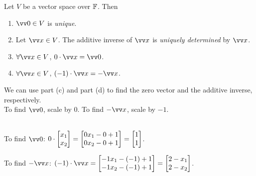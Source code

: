 \begin{proposition}
    Let $V$ be a vector space over ${\mathbb{F}}$. Then
    \begin{enumerate}[label=(\alph*)]
        \item $\vzero \in V$ is \textit{unique}.
        \item Let $\vx \in V$. The additive inverse of $\vx$ is \textit{uniquely determined}
        by $\vx$.
        \item $\forall \vx \in V$, $0 \cdot \vx = \vzero$.
        \item $\forall \vx \in V$, $(-1) \cdot \vx = -\vx$.
    \end{enumerate}
\end{proposition}

\begin{remark}
    We can use part (c) and part (d) to find the zero vector and the additive inverse, respectively.    \\
    To find $\vzero$, scale by 0. To find $-\vx$, scale by $-1$.

    \begin{example}
        \phantom{}  \vspace{1mm} \\
        To find $\vzero$: \quad
        $0 \cdot \begin{bmatrix} x_1 \\ x_2 \end{bmatrix} = \begin{bmatrix} 0x_1 - 0 + 1 \\ 0x_2 - 0 + 1 \end{bmatrix} = \begin{bmatrix} 1 \\ 1 \end{bmatrix}$.

        To find $-\vx$: \quad
        $(-1) \cdot \vx = \cv{-1x_1 - (-1) + 1 \\ -1x_2 - (-1) + 1} = \cv{2-x_1 \\ 2-x_2}$.
    \end{example}
\end{remark}

\makebox[\linewidth]{\hrulefill}

